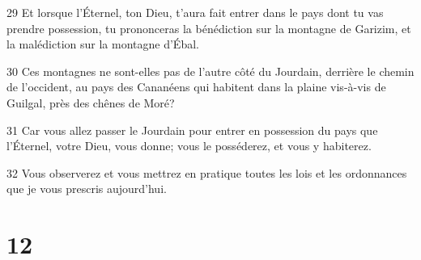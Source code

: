 \par 29 Et lorsque l'Éternel, ton Dieu, t'aura fait entrer dans le pays dont tu vas prendre possession, tu prononceras la bénédiction sur la montagne de Garizim, et la malédiction sur la montagne d'Ébal.
\par 30 Ces montagnes ne sont-elles pas de l'autre côté du Jourdain, derrière le chemin de l'occident, au pays des Cananéens qui habitent dans la plaine vis-à-vis de Guilgal, près des chênes de Moré?
\par 31 Car vous allez passer le Jourdain pour entrer en possession du pays que l'Éternel, votre Dieu, vous donne; vous le posséderez, et vous y habiterez.
\par 32 Vous observerez et vous mettrez en pratique toutes les lois et les ordonnances que je vous prescris aujourd'hui.

\chapter{12}

